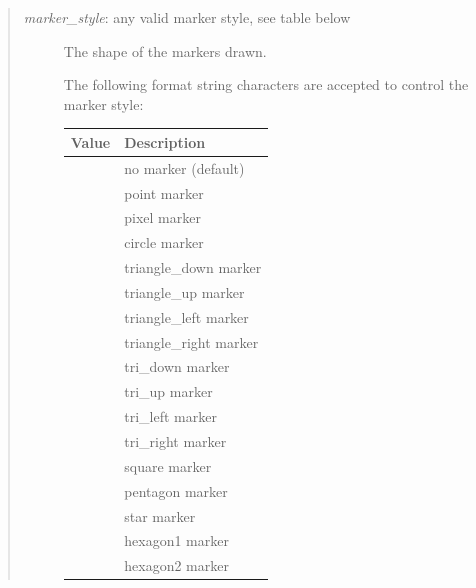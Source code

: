 \documentclass[letterpaper,10pt,english]{sphinxmanual}
\begin{document}
\begin{fulllineitems}
\begin{fulllineitems}
\begin{quote}
\begin{description}
\item[{\emph{marker\_style}: any valid marker style, see table below}] \leavevmode
The shape of the markers drawn.

The following format string characters are accepted to control
the marker style:

\begin{tabulary}{\linewidth}{|L|L|}
\hline
\textbf{
Value
} & \textbf{
Description
}\\\hline

 & 
no marker (default)
\\\hline

 & 
point marker
\\\hline

 & 
pixel marker
\\\hline

 & 
circle marker
\\\hline

 & 
triangle\_down marker
\\\hline

 & 
triangle\_up marker
\\\hline

 & 
triangle\_left marker
\\\hline

 & 
triangle\_right marker
\\\hline

 & 
tri\_down marker
\\\hline

 & 
tri\_up marker
\\\hline

 & 
tri\_left marker
\\\hline

 & 
tri\_right marker
\\\hline

 & 
square marker
\\\hline

 & 
pentagon marker
\\\hline

 & 
star marker
\\\hline

 & 
hexagon1 marker
\\\hline

 & 
hexagon2 marker
\\\hline


\end{tabulary}
\end{description}
\end{quote}
\end{fulllineitems}
\end{fulllineitems}
\end{document}
